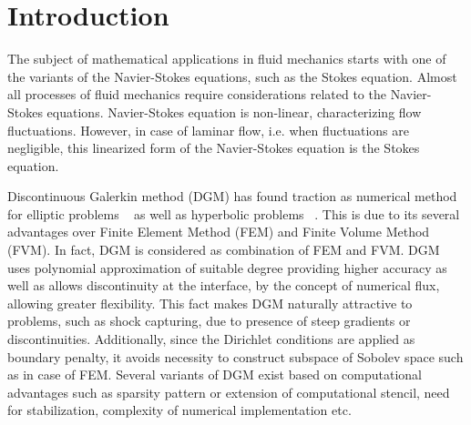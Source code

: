 \documentclass[graybox]{svmult}
\begin{document}

\section{Introduction}
\label{introduction}

The subject of mathematical applications in fluid mechanics starts with one of the variants of the Navier-Stokes equations, such as the Stokes equation. Almost all processes of fluid mechanics require considerations related to the Navier-Stokes equations. Navier-Stokes equation is non-linear, characterizing flow fluctuations. However, in case of laminar flow, i.e. when fluctuations are negligible, this linearized form of the Navier-Stokes equation is the Stokes equation.

Discontinuous Galerkin method (DGM) has found traction as numerical method for elliptic problems ~\cite{peraire} as well as hyperbolic problems ~\cite{hyperbolic}. This is due to its several advantages over Finite Element Method (FEM) and Finite Volume Method (FVM). In fact, DGM is considered as combination of FEM and FVM. DGM uses polynomial approximation of suitable degree providing higher accuracy as well as allows discontinuity at the interface, by the concept of numerical flux, allowing greater flexibility. This fact makes DGM naturally attractive to problems, such as shock capturing, due to presence of steep gradients or discontinuities. Additionally, since the Dirichlet conditions are applied as boundary penalty, it avoids necessity to construct subspace of Sobolev space such as in case of FEM. Several variants of DGM exist based on computational advantages such as sparsity pattern or extension of computational stencil, need for stabilization, complexity of numerical implementation etc.
\end{document}

